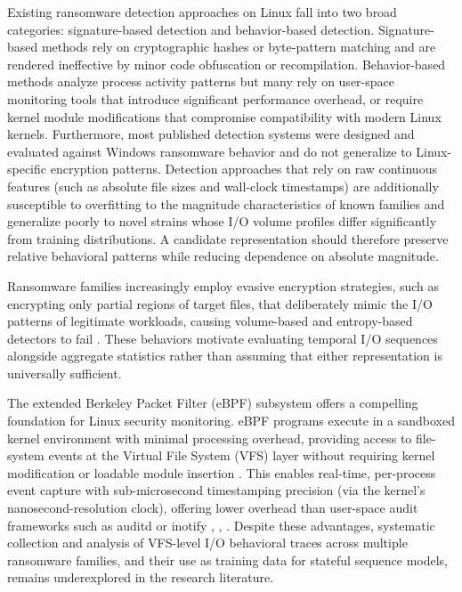 Existing ransomware detection approaches on Linux fall into two broad categories: signature-based detection and behavior-based detection. Signature-based methods rely on cryptographic hashes or byte-pattern matching and are rendered ineffective by minor code obfuscation or recompilation. Behavior-based methods analyze process activity patterns but many rely on user-space monitoring tools that introduce significant performance overhead, or require kernel module modifications that compromise compatibility with modern Linux kernels. Furthermore, most published detection systems were designed and evaluated against Windows ransomware behavior and do not generalize to Linux-specific encryption patterns. Detection approaches that rely on raw continuous features (such as absolute file sizes and wall-clock timestamps) are additionally susceptible to overfitting to the magnitude characteristics of known families and generalize poorly to novel strains whose I/\allowbreak{}O volume profiles differ significantly from training distributions. A candidate representation should therefore preserve relative behavioral patterns while reducing dependence on absolute magnitude.

Ransomware families increasingly employ evasive encryption strategies, such as encrypting only partial regions of target files, that deliberately mimic the I/\allowbreak{}O patterns of legitimate workloads, causing volume-based and entropy-based detectors to fail \cite{ref15}. These behaviors motivate evaluating temporal I/\allowbreak{}O sequences alongside aggregate statistics rather than assuming that either representation is universally sufficient.

The extended Berkeley Packet Filter (eBPF) subsystem offers a compelling foundation for Linux security monitoring. eBPF programs execute in a sandboxed kernel environment with minimal processing overhead, providing access to file-system events at the Virtual File System (VFS) layer without requiring kernel modification or loadable module insertion \cite{ref10}. This enables real-time, per-process event capture with sub-microsecond timestamping precision (via the kernel's nanosecond-resolution clock), offering lower overhead than user-space audit frameworks such as auditd or inotify \cite{ref10}, \cite{ref11}, \cite{ref40}. Despite these advantages, systematic collection and analysis of VFS-level I/\allowbreak{}O behavioral traces across multiple ransomware families, and their use as training data for stateful sequence models, remains underexplored in the research literature.

